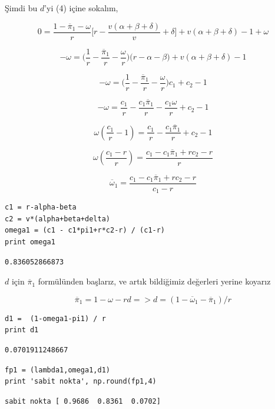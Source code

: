 \documentclass[12pt,fleqn]{article}\usepackage{../../common}
\begin{document}
Şimdi bu $d$'yi (4) içine sokalım,

$$ 
0 =  \frac{1-\overline{\pi}_1-\omega}{r} \bigg[
r - \frac{v (\alpha + \beta + \delta)}{v} + \delta
\bigg] + v (\alpha + \beta + \delta)- 1+\omega
$$

$$ 
-\omega =  \bigg(\frac{1}{r}-\frac{\overline{\pi}_1}{r}-\frac{\omega}{r}\bigg) \bigg(
r - \alpha - \beta 
\bigg) + v (\alpha + \beta + \delta)- 1
$$

$$ 
-\omega =
\bigg(\frac{1}{r}-\frac{\overline{\pi}_1}{r}-\frac{\omega}{r}\bigg)c_1 +
c_2 - 1
$$

$$ 
-\omega = \frac{c_1}{r}-\frac{c_1\overline{\pi}_1}{r}-\frac{c_1 \omega}{r}  +c_2 - 1
$$

$$ 
\omega(\frac{c_1 }{r} -1) = \frac{c_1}{r}-\frac{c_1 \overline{\pi}_1}{r} +c_2 - 1
$$

$$ 
\omega(\frac{c_1-r }{r}) = \frac{c_1 - c_1 \overline{\pi}_1 + rc_2 - r}{r}
$$

$$ 
\overline{\omega}_1 = \frac{c_1 - c_1\overline{\pi}_1 + rc_2 - r}{c_1 - r}
$$

\begin{verbatim}
c1 = r-alpha-beta
c2 = v*(alpha+beta+delta)
omega1 = (c1 - c1*pi1+r*c2-r) / (c1-r)
print omega1
\end{verbatim}

\begin{verbatim}
0.836052866873
\end{verbatim}

$d$ için $\overline{\pi}_1 $ formülünden başlarız, ve artık bildiğimiz
değerleri yerine koyarız

$$ \overline{\pi}_1 = 1-\omega-rd => 
d = (1-\overline{\omega}_1 -\overline{\pi}_1) / r $$

\begin{verbatim}
d1 =  (1-omega1-pi1) / r
print d1
\end{verbatim}

\begin{verbatim}
0.0701911248667
\end{verbatim}


\begin{verbatim}
fp1 = (lambda1,omega1,d1)
print 'sabit nokta', np.round(fp1,4)
\end{verbatim}

\begin{verbatim}
sabit nokta [ 0.9686  0.8361  0.0702]
\end{verbatim}
\end{document}
